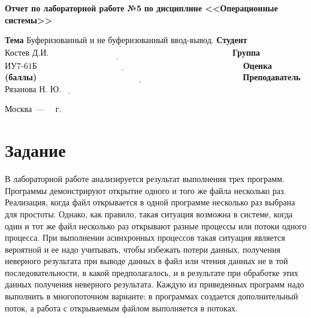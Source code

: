 \documentclass[12pt]{report}
\begin{document}
\begin{titlepage}
		\begin{center}
			\noindent\begin{minipage}{1.1\textwidth}\centering
				\Large\textbf{Отчет по лабораторной работе №5}\newline
				\textbf{по дисциплине <<Операционные системы>>}\newline\newline
			\end{minipage}
		\end{center}
		
		\noindent\textbf{Тема} $\underline{\text{Буферизованный и не буферизованный ввод-вывод.}}$\newline\newline
		\noindent\textbf{Студент} $\underline{\text{Костев Д.И.~~~~~~~~~~~~~~~~~~~~~~~~~~~~~~~~~~~~~~~~~~~~~~~~~~~~~~~~~~~~~~~~~}}$\newline\newline
		\noindent\textbf{Группа} $\underline{\text{ИУ7-61Б~~~~~~~~~~~~~~~~~~~~~~~~~~~~~~~~~~~~~~~~~~~~~~~~~~~~~~~~~~~~~~~~~~~~~~~~~}}$\newline\newline
		\noindent\textbf{Оценка (баллы)} $\underline{\text{~~~~~~~~~~~~~~~~~~~~~~~~~~~~~~~~~~~~~~~~~~~~~~~~~~~~~~~~~~~~~~~~~~~~~~~~}}$\newline\newline
		\noindent\textbf{Преподаватель} $\underline{\text{Рязанова Н. Ю.~~~~~~~~~~~~~~~~~~~~~~~~~~}}$\newline\newline\newline
		
		\begin{center}
			\vfill
			Москва~---~\the\year
			~г.
		\end{center}
	\end{titlepage}
\section*{Задание}
В лабораторной работе анализируется результат выполнения трех программ. Программы демонстрируют открытие одного и того же файла несколько раз. Реализация, когда файл открывается в одной программе несколько раз выбрана для простоты. Однако, как правило, такая ситуация возможна в системе, когда один и тот же файл несколько раз открывают разные процессы или потоки одного процесса. При выполнении асинхронных процессов такая ситуация является вероятной и ее надо учитывать, чтобы избежать потери данных, получения неверного результата при выводе данных в файл или чтения данных не в той последовательности, в какой предполагалось, и в результате при обработке этих данных получения неверного результата.
Каждую из приведенных программ надо выполнить в многопоточном варианте: в программах создается дополнительный поток, а работа с открываемым файлом выполняется в потоках.
\end{document}
